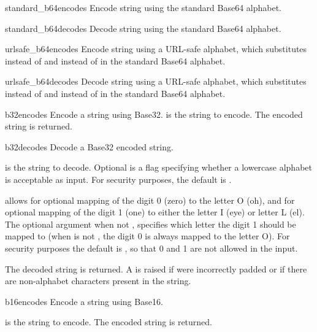 \begin{funcdesc}{standard_b64encode}{s}
Encode string  using the standard Base64 alphabet.
\end{funcdesc}

\begin{funcdesc}{standard_b64decode}{s}
Decode string  using the standard Base64 alphabet.
\end{funcdesc}

\begin{funcdesc}{urlsafe_b64encode}{s}
Encode string  using a URL-safe alphabet, which substitutes
\code{-} instead of \code{+} and \code{_} instead of \code{/} in the
standard Base64 alphabet.
\end{funcdesc}

\begin{funcdesc}{urlsafe_b64decode}{s}
Decode string  using a URL-safe alphabet, which substitutes
\code{-} instead of \code{+} and \code{_} instead of \code{/} in the
standard Base64 alphabet.
\end{funcdesc}

\begin{funcdesc}{b32encode}{s}
Encode a string using Base32.   is the string to encode.  The
encoded string is returned.
\end{funcdesc}

\begin{funcdesc}{b32decode}{s}
Decode a Base32 encoded string.

 is the string to decode.  Optional  is a flag
specifying whether a lowercase alphabet is acceptable as input.  For
security purposes, the default is .

 allows for optional mapping of the digit 0 (zero) to the
letter O (oh), and for optional mapping of the digit 1 (one) to either
the letter I (eye) or letter L (el).  The optional argument
 when not , specifies which letter the digit 1 should
be mapped to (when  is not , the digit 0 is always
mapped to the letter O).  For security purposes the default is
, so that 0 and 1 are not allowed in the input.

The decoded string is returned.  A  is raised if
 were incorrectly padded or if there are non-alphabet characters
present in the string.
\end{funcdesc}

\begin{funcdesc}{b16encode}{s}
Encode a string using Base16.

 is the string to encode.  The encoded string is returned.
\end{funcdesc}

